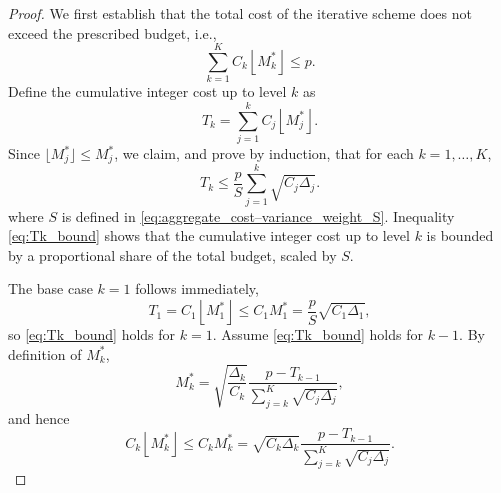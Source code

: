 \begin{proof}
We first establish that the total cost of the iterative scheme does not exceed the prescribed budget, i.e.,
\[
\sum_{k=1}^K C_k \left\lfloor M_k^* \right\rfloor \le p.
\]
Define the cumulative integer cost up to level $k$ as
\[
T_k = \sum_{j=1}^k C_j\left\lfloor M_j^* \right\rfloor.
\]
Since $\lfloor M_j^* \rfloor \le M_j^*$, we claim, and prove by induction, that for each $k = 1, \ldots, K$,
\begin{equation}\label{eq:Tk_bound}
T_k \le \frac{p}{S}\sum_{j=1}^k \sqrt{C_j \Delta_j}.
\end{equation}
where $S$ is defined in \eqref{eq:aggregate_cost–variance_weight_S}. Inequality \eqref{eq:Tk_bound} shows that the cumulative integer cost up to level $k$ is bounded by a proportional share of the total budget, scaled by $S$.




The base case $k=1$ follows immediately,
\[
T_1=C_1 \left\lfloor M_1^* \right\rfloor \le C_1M_1^* = \frac{p}{S}\sqrt{C_1\Delta_1},
\]
so \eqref{eq:Tk_bound} holds for \(k=1\). Assume \eqref{eq:Tk_bound} holds for \(k-1\). By definition of \(M_k^*\),
%
\[
M_k^* = \sqrt{\frac{\Delta_k}{C_k}}\frac{p - T_{k-1}}{\sum_{j=k}^K \sqrt{C_j\Delta_j}},
\]
%
and hence
%
\[
C_k \left\lfloor M_k^* \right\rfloor \le C_k M_k^*  = \sqrt{C_k\Delta_k}\frac{p-T_{k-1}}{\sum_{j=k}^K\sqrt{C_j\Delta_j}}.
\]
%


\end{proof}
